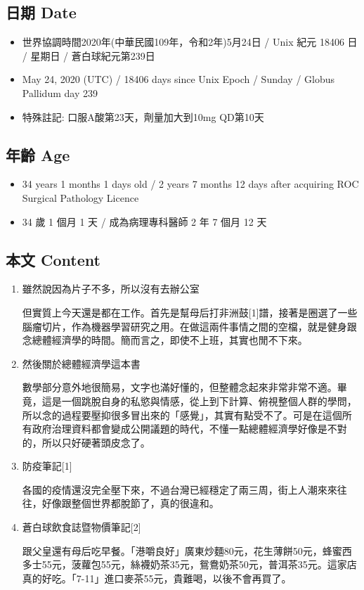 \documentclass[a5paper, 11pt
]{book}
\providecommand{\tightlist}{%
  \setlength{\itemsep}{0pt}\setlength{\parskip}{0pt}}
\begin{document}
\hypertarget{ux65e5ux671f-date-84}{%
\subsection{日期 Date}\label{ux65e5ux671f-date-84}}

\begin{itemize}
\tightlist
\item
  世界協調時間2020年(中華民國109年，令和2年)5月24日 / Unix 紀元 18406 日
  / 星期日 / 蒼白球紀元第239日
\item
  May 24, 2020 (UTC) / 18406 days since Unix Epoch / Sunday / Globus
  Pallidum day 239
\item
  特殊註記: 口服A酸第23天，劑量加大到10mg QD第10天
\end{itemize}

\hypertarget{ux5e74ux9f61-age-84}{%
\subsection{年齡 Age}\label{ux5e74ux9f61-age-84}}

\begin{itemize}
\tightlist
\item
  34 years 1 months 1 days old / 2 years 7 months 12 days after
  acquiring ROC Surgical Pathology Licence
\item
  34 歲 1 個月 1 天 / 成為病理專科醫師 2 年 7 個月 12 天
\end{itemize}

\hypertarget{ux672cux6587-content-84}{%
\subsection{本文 Content}\label{ux672cux6587-content-84}}

\begin{enumerate}
\def\labelenumi{\arabic{enumi}.}
\item
  雖然說因為片子不多，所以沒有去辦公室

  但實質上今天還是都在工作。首先是幫母后打非洲鼓{[}1{]}譜，接著是圈選了一些腦瘤切片，作為機器學習研究之用。在做這兩件事情之間的空檔，就是健身跟念總體經濟學的時間。簡而言之，即使不上班，其實也閒不下來。
\item
  然後關於總體經濟學這本書

  數學部分意外地很簡易，文字也滿好懂的，但整體念起來非常非常不適。畢竟，這是一個跳脫自身的私慾與情感，從上到下計算、俯視整個人群的學問，所以念的過程要壓抑很多冒出來的「感覺」，其實有點受不了。可是在這個所有政府治理資料都會變成公開議題的時代，不懂一點總體經濟學好像是不對的，所以只好硬著頭皮念了。
\item
  防疫筆記{[}1{]}

  各國的疫情還沒完全壓下來，不過台灣已經穩定了兩三周，街上人潮來來往往，好像跟整個世界都脫節了，真的很違和。
\item
  蒼白球飲食誌暨物價筆記{[}2{]}

  跟父皇還有母后吃早餐。「港嚼良好」廣東炒麵80元，花生薄餅50元，蜂蜜西多士55元，菠蘿包55元，絲襪奶茶35元，鴛鴦奶茶50元，普洱茶35元。這家店真的好吃。「7-11」進口麥茶55元，貴難喝，以後不會再買了。
\end{enumerate}
\end{document}
